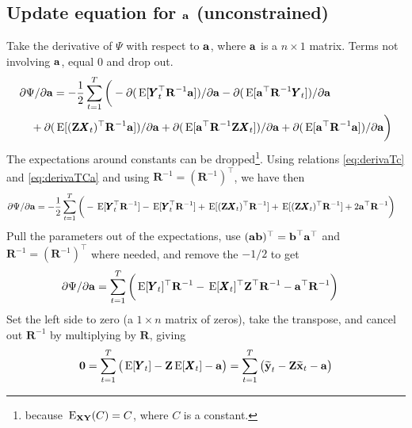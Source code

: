 \documentclass[]{article}
\def\XI{\mbox{\boldmath $\Xi$}}
\def\E{\,\textup{\textrm{E}}}
\def\EXy{\,\textup{\textrm{E}}_{\text{{\bf XY}}}}
\def\RR{\mbox{$\mathbf R$}}	 \def\rr{\mbox{$\mathbf r$}} \def\Rb{\mbox{$\mathbf H$}}	\def\Rm{\mathbb{R}}
\def\XX{\mbox{$\pmb{X}$}}	\def\xx{\mbox{$\pmb{x}$}}
\def\YY{\mbox{$\pmb{Y}$}}	\def\yy{\mbox{$\pmb{y}$}}
\def\ZZ{\mbox{$\mathbf Z$}}	\def\zz{\mbox{$\mathbf z$}}	\def\Zb{\mbox{$\mathbf M$}} \def\Za{\mbox{$\mathbf N$}} \def\Zm{\XI}
\def\hatxt{\widetilde{\mbox{$\mathbf x$}}_t}
\def\hatyt{\widetilde{\mbox{$\mathbf y$}}_t}
\begin{document}
\subsection{Update equation for $\aa$ (unconstrained)}\label{sec:unconstA}
Take the derivative of $\Psi$ with respect to $\aa$, where $\aa$ is a $n \times 1$ matrix.  Terms not involving $\aa$, equal 0 and drop out.  
\begin{equation}\label{eq:a.unconstrained1}
\begin{split}
&\partial\Psi/\partial\aa = - \frac{1}{2}\sum_{t=1}^T \bigg(- \partial(\E[\YY_t^\top\RR^{-1}\aa])/\partial\aa
- \partial(\E[\aa^\top\RR^{-1}\YY_t])/\partial\aa \\
&\quad + \partial(\E[(\ZZ\XX_t)^\top\RR^{-1}\aa])/\partial\aa 
+ \partial(\E[\aa^\top\RR^{-1}\ZZ\XX_t])/\partial\aa 
+ \partial(\E[\aa^\top\RR^{-1}\aa])/\partial\aa \bigg)
\end{split}
\end{equation}
The expectations around constants can be dropped\footnote{
because $\EXy(C)=C$, where $C$ is a constant.}.  Using relations \eqref{eq:derivaTc} and \eqref{eq:derivaTCa} and using $\RR^{-1} = (\RR^{-1})^\top$, we have then
\begin{equation}\label{eq:a.unconstrained2}
\begin{split}
&\partial\Psi/\partial\aa = - \frac{1}{2}\sum_{t=1}^T\bigg(-\E[\YY_t^\top\RR^{-1}]
-\E[\YY_t^\top\RR^{-1}] + \E[(\ZZ\XX_t)^\top\RR^{-1}] 
  + \E[(\ZZ\XX_t)^\top\RR^{-1}] + 2\aa^\top\RR^{-1} \bigg)
\end{split}
\end{equation}
Pull the parameters out of the expectations, use $(\aa\bb)^\top = \bb^\top\aa^\top$ and $\RR^{-1} = (\RR^{-1})^\top$ where needed, and remove the $-1/2$ to get
\begin{equation}\label{eq:a.unconstrained3}
\begin{split}
&\partial\Psi/\partial\aa = \sum_{t=1}^T\bigg(\E[\YY_t]^\top\RR^{-1}
 - \E[\XX_t]^\top\ZZ^\top\RR^{-1} - \aa^\top\RR^{-1} \bigg)
\end{split}
\end{equation}
Set the left side to zero (a $1 \times n$ matrix of zeros), take the transpose, and cancel out $\RR^{-1}$ by multiplying by $\RR$, giving
\begin{equation}\label{eq:a.unconstrained4}
\mathbf{0} = \sum_{t=1}^{T}\big(\E[\YY_t] - \ZZ\E[\XX_t] - \aa \big)
=\sum_{t=1}^{T}\big(\hatyt - \ZZ\hatxt - \aa\big)
\end{equation}
\end{document}
